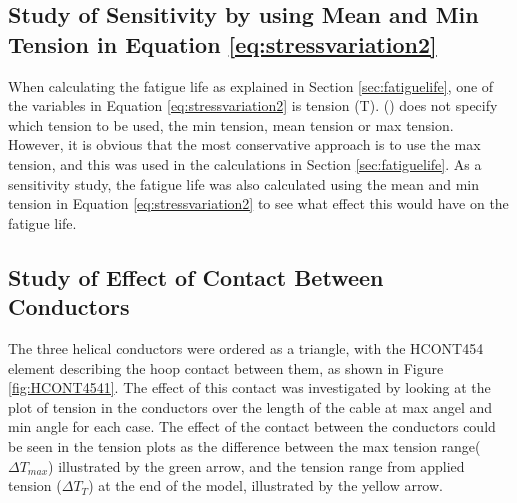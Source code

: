 \subsection{Study of Sensitivity by using Mean and Min Tension in Equation \ref{eq:stressvariation2}}
\label{sec:min}
When calculating the fatigue life as explained in Section \ref{sec:fatiguelife}, one of the variables in Equation \ref{eq:stressvariation2} is tension (T). (\cite{s300}) does not specify which tension to be used, the min tension, mean tension or max tension. However, it is obvious that the most conservative approach is to use the max tension, and this was used in the calculations in Section \ref{sec:fatiguelife}. As a sensitivity study, the fatigue life was also calculated using the mean and min tension in Equation \ref{eq:stressvariation2} to see what effect this would have on the fatigue life. 
\subsection{Study of Effect of Contact Between Conductors}
The three helical conductors were ordered as a triangle, with the HCONT454 element describing the hoop contact between them, as shown in Figure \ref{fig:HCONT4541}. The effect of this contact was investigated by looking at the plot of tension in the conductors over the length of the cable at max angel and min angle for each case. The effect of the contact between the conductors could be seen in the tension plots as the difference between the max tension range($\Delta T_{max}$) illustrated by the green arrow, and the tension range from applied tension ($\Delta T_T$) at the end of the model, illustrated by the yellow arrow. 

